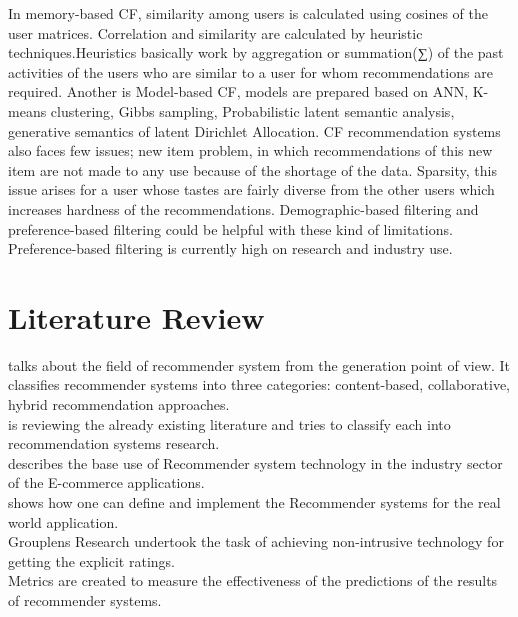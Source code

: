 \documentclass[12pt,a4paper]{article}
\begin{document}
In memory-based CF, similarity among users is calculated using cosines of the user matrices. Correlation and similarity are calculated by heuristic techniques.Heuristics basically work by aggregation or summation(∑) of the past activities of the users who are similar to a user for whom recommendations are required. Another is Model-based CF, models are prepared based on ANN, K-means clustering, Gibbs sampling, Probabilistic latent semantic analysis, generative semantics of latent Dirichlet Allocation. CF recommendation systems also faces few issues; new item problem, in which recommendations of this new item are not made to any use because of the shortage of the data. Sparsity, this issue arises for a user whose tastes are fairly diverse from the other users which increases hardness of the recommendations. Demographic-based filtering and preference-based filtering could be helpful with these kind of limitations. Preference-based filtering is currently high on research and industry use.\\

	\newpage
	\section{Literature Review}
	
	\cite{adomavicius2005toward} talks about the field of recommender system from the generation point of view. It classifies recommender systems into three categories: content-based, collaborative, hybrid recommendation approaches. \\
	
	\cite{park2012literature} is reviewing the already existing literature and tries to classify each into recommendation systems research.\\
	
	\cite{linden2003amazon} describes the base use of Recommender system technology in the industry sector of the E-commerce applications.\\
	
	\cite{sarwar2001item} shows how one can define and implement the Recommender systems for the real world application.\\
	
	\cite{konstan1997grouplens} Grouplens Research undertook the task of achieving non-intrusive technology for getting the explicit ratings.\\
	
	\cite{schein2002methods} Metrics are created to measure the effectiveness of the predictions of the results of recommender systems.\\
	
\end{document}
